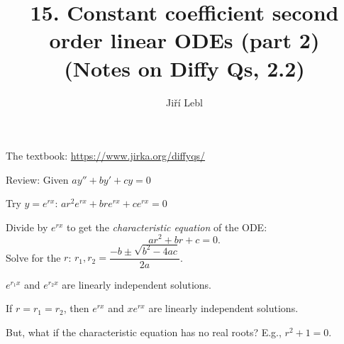 \documentclass[10pt,aspectratio=169]{beamer}
\author{Ji\v{r}\'i Lebl}
\institute[OSU]{%
Oklahoma State University%
}
\title{15. Constant coefficient second order linear ODEs (part 2)\\(Notes on Diffy Qs, 2.2)}
\date{}
\begin{document}
\begin{frame}
\titlepage


\begin{center}
The textbook: \url{https://www.jirka.org/diffyqs/}
\end{center}
\end{frame}

\begin{frame}
Review: Given
\quad
$a y'' + b y' + c y = 0$

\medskip

Try $y = e^{rx}$:
\quad
$a r^2 e^{rx} + 
b r e^{rx} + 
c e^{rx} = 0$

\medskip
\pause
Divide by $e^{rx}$ to get the
\emph{characteristic equation} of the ODE:
\[
a r^2 + 
b r + 
c = 0 .
\]
\pause
Solve for the $r$:
\qquad 
$r_1, r_2 = \dfrac{-b \pm \sqrt{b^2 - 4ac}}{2a}$.

\medskip
\pause

\wthus $e^{r_1 x}$ and $e^{r_2 x}$ are linearly independent solutions.

\medskip
\pause

If $r=r_1=r_2$, then $e^{rx}$ and $xe^{rx}$ are linearly independent
solutions.

\medskip
\pause

But, what if the characteristic equation has no real roots?
E.g., $r^2+1=0$.
\end{frame}
\end{document}
